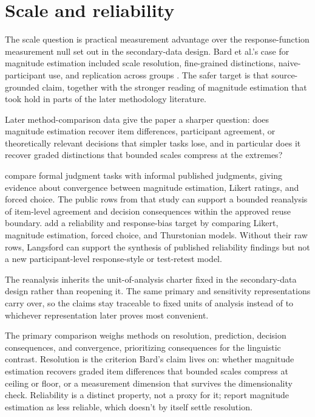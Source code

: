 \section{Scale and reliability}

The scale question is practical measurement advantage over
the response-function measurement null set out in the secondary-data design.
Bard et al.'s case for magnitude estimation included scale resolution,
fine-grained distinctions, naive-participant use, and replication across groups
\citep[32]{BardEtAl1996}. The safer target is that source-grounded claim,
together with the stronger reading of magnitude estimation that took hold in
parts of the later methodology literature.

Later method-comparison data give the paper a sharper question: does magnitude
estimation recover item differences, participant agreement, or theoretically
relevant decisions that simpler tasks lose, and in particular does it recover
graded distinctions that bounded scales compress at the extremes?

\textcite{sprouse2013} compare formal judgment tasks with informal published
judgments, giving evidence about convergence between magnitude estimation,
Likert ratings, and forced choice. The public rows from that study can support a
bounded reanalysis of item-level agreement and decision consequences within
the approved reuse boundary. \textcite{LangsfordEtAl2018} add a reliability and
response-bias target by comparing Likert, magnitude estimation, forced choice,
and Thurstonian models. Without their raw rows, Langsford can support the
synthesis of published reliability findings but not a new participant-level
response-style or test-retest model.

The reanalysis inherits the unit-of-analysis charter fixed in the secondary-data
design rather than reopening it. The same primary and sensitivity
representations carry over, so the claims stay traceable to fixed units of
analysis instead of to whichever representation later proves most convenient.

The primary comparison weighs methods on resolution, prediction, decision
consequences, and convergence, prioritizing consequences for the linguistic
contrast. Resolution is the criterion Bard's claim lives on: whether magnitude
estimation recovers graded item differences that bounded scales compress at
ceiling or floor, or a measurement dimension that survives the dimensionality
check. Reliability is a distinct property, not a proxy for it;
\textcite{LangsfordEtAl2018} report magnitude estimation as less reliable, which
doesn't by itself settle resolution.

